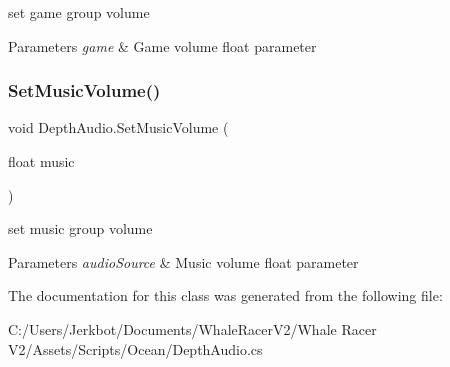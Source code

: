 set game group volume 
\begin{DoxyParams}{Parameters}
{\em game} & Game volume float parameter\\
\hline
\end{DoxyParams}


\mbox{\label{class_depth_audio_a78b5f1a8e922b5e56fff1846b739822f}} 
\subsubsection{\texorpdfstring{Set\+Music\+Volume()}{SetMusicVolume()}}
{\footnotesize\ttfamily void Depth\+Audio.\+Set\+Music\+Volume (\begin{DoxyParamCaption}\item[{float}]{music }\end{DoxyParamCaption})}



set music group volume 
\begin{DoxyParams}{Parameters}
{\em audio\+Source} & Music volume float parameter\\
\hline
\end{DoxyParams}




The documentation for this class was generated from the following file\+:\begin{DoxyCompactItemize}
\item 
C\+:/\+Users/\+Jerkbot/\+Documents/\+Whale\+Racer\+V2/\+Whale Racer V2/\+Assets/\+Scripts/\+Ocean/Depth\+Audio.\+cs\end{DoxyCompactItemize}
